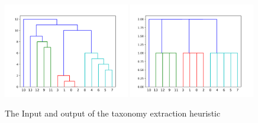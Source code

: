 \begin{figure}[htp]
    \includegraphics[width=0.49\textwidth]{img/extract_ex_dendro.png}
    \includegraphics[width=0.49\textwidth]{img/extract_ex_taxo.png}
    \caption{The Input and output of the taxonomy extraction heuristic}
    \label{fig:my_label}
\end{figure} 
